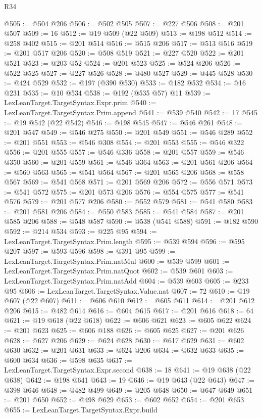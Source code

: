 \begin{lexlean}{R34}
\begin{coremodule}
@505 := @504 @206
@506 := @502 @505
@507 := @227 @506
@508 := @201 @507
@509 := 16
@512 := @19 @509 (@22 @509)
@513 := @198 @512
@514 := @258 @402
@515 := @201 @514
@516 := @515 @206
@517 := @513 @516
@519 := @201 @517 @206
@520 := @508 @519
@521 := @227 @520
@522 := @201 @521
@523 := @203 @52
@524 := @201 @523
@525 := @524 @206
@526 := @522 @525
@527 := @227 @526
@528 := @480 @527
@529 := @445 @528
@530 := @424 @529
@532 := @197 (@390 @530)
@533 := @182 @532
@534 := @16 @231
@535 := @10 @534
@538 := @192 (@535 @57) @11
@539 := LexLeanTarget.TargetSyntax.Expr.prim
@540 := LexLeanTarget.TargetSyntax.Prim.append
@541 := @539 @540
@542 := 17
@545 := @19 @542 (@22 @542)
@546 := @198 @545
@547 := @546 @261
@548 := @201 @547
@549 := @546 @275
@550 := @201 @549
@551 := @546 @289
@552 := @201 @551
@553 := @546 @308
@554 := @201 @553
@555 := @546 @322
@556 := @201 @555
@557 := @546 @336
@558 := @201 @557
@559 := @546 @350
@560 := @201 @559
@561 := @546 @364
@563 := @201 @561 @206
@564 := @560 @563
@565 := @541 @564
@567 := @201 @565 @206
@568 := @558 @567
@569 := @541 @568
@571 := @201 @569 @206
@572 := @556 @571
@573 := @541 @572
@575 := @201 @573 @206
@576 := @554 @575
@577 := @541 @576
@579 := @201 @577 @206
@580 := @552 @579
@581 := @541 @580
@583 := @201 @581 @206
@584 := @550 @583
@585 := @541 @584
@587 := @201 @585 @206
@588 := @548 @587
@590 := @538 (@541 @588)
@591 := @182 @590
@592 := @214 @534
@593 := @225 @95
@594 := LexLeanTarget.TargetSyntax.Prim.length
@595 := @539 @594
@596 := @595 @207
@597 := @593 @596
@598 := @391 @95
@599 := LexLeanTarget.TargetSyntax.Prim.natMul
@600 := @539 @599
@601 := LexLeanTarget.TargetSyntax.Prim.natQuot
@602 := @539 @601
@603 := LexLeanTarget.TargetSyntax.Prim.natAdd
@604 := @539 @603
@605 := @233 @95
@606 := LexLeanTarget.TargetSyntax.Value.nat
@607 := 72
@610 := @19 @607 (@22 @607)
@611 := @606 @610
@612 := @605 @611
@614 := @201 @612 @206
@615 := @482 @614
@616 := @604 @615
@617 := @201 @616
@618 := 64
@621 := @19 @618 (@22 @618)
@622 := @606 @621
@623 := @605 @622
@624 := @201 @623
@625 := @606 @188
@626 := @605 @625
@627 := @201 @626
@628 := @627 @206
@629 := @624 @628
@630 := @617 @629
@631 := @602 @630
@632 := @201 @631
@633 := @624 @206
@634 := @632 @633
@635 := @600 @634
@636 := @598 @635
@637 := LexLeanTarget.TargetSyntax.Expr.second
@638 := 18
@641 := @19 @638 (@22 @638)
@642 := @198 @641
@643 := 19
@646 := @19 @643 (@22 @643)
@647 := @398 @646
@648 := @482 @499
@649 := @205 @648
@650 := @647 @649
@651 := @201 @650
@652 := @498 @629
@653 := @602 @652
@654 := @201 @653
@655 := LexLeanTarget.TargetSyntax.Expr.build

\end{coremodule}
\end{lexlean}
